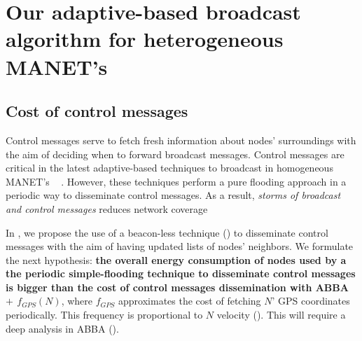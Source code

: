 
\section{Our adaptive-based broadcast algorithm for heterogeneous MANET's}

\subsection{Cost of control messages}
Control messages serve to fetch fresh information about nodes' surroundings with the aim of deciding when to forward broadcast messages.
%
Control messages are critical in the latest adaptive-based techniques to broadcast in homogeneous MANET's ~\cite{hypergossiping, ProbFlood} .
%
However, these techniques perform a pure flooding approach in a periodic way to disseminate control messages.
%
As a result, \emph{storms of broadcast and control messages} reduces network coverage 

In \OurAdaptiveTech, we propose the use of a beacon-less technique () to disseminate control messages with the aim of having updated lists of nodes' neighbors. We formulate the next hypothesis: \textbf{the overall energy consumption of nodes used by a the periodic simple-flooding technique to disseminate control messages is bigger than the cost of control messages dissemination with ABBA $+$ $f_{GPS}(N)$}, where $f_{GPS}$ approximates the cost of fetching $N$' GPS coordinates periodically. This frequency is proportional to $N$ velocity (). This will require a deep analysis in ABBA ().


